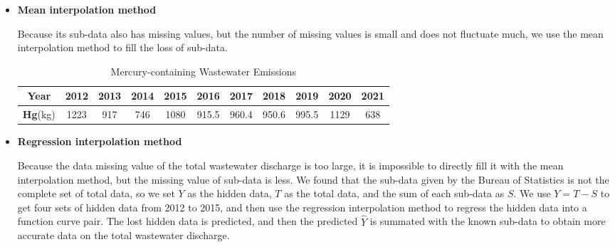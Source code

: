 \documentclass[12pt]{article}
\begin{document}
	
	\begin{itemize}
		\item \textbf{Mean interpolation method}
		
		Because its sub-data also has missing values, but the number of missing values is small and does not fluctuate much, we use the mean interpolation method to fill the loss of sub-data.
		
		\begin{table}[!htbp]
			\begin{center}
				\caption{Mercury-containing Wastewater Emissions}
				\label{}
				\begin{tabular}{ccccccccccc}
					\toprule
					\multicolumn{1}{m{2cm}}{\centering \textbf{Year}}
					& \multicolumn{1}{m{1cm}}{\centering \small 2012}
					& \multicolumn{1}{m{1cm}}{\centering \small 2013}
					& \multicolumn{1}{m{1cm}}{\centering \small 2014}
					& \multicolumn{1}{m{1cm}}{\centering \small 2015}
					& \multicolumn{1}{m{1cm}}{\centering \small 2016}
					& \multicolumn{1}{m{1cm}}{\centering \small 2017}
					& \multicolumn{1}{m{1cm}}{\centering \small 2018}
					& \multicolumn{1}{m{1cm}}{\centering \small 2019}
					& \multicolumn{1}{m{1cm}}{\centering \small 2020}
					& \multicolumn{1}{m{1cm}}{\centering \small 2021}\\
					\midrule
					\small \textbf{Hg}(kg) & 1223 & 917 & 746 & 1080 & 915.5 & 960.4 & 950.6 & 995.5 & 1129 & 638\\
					\bottomrule
				\end{tabular}
			\end{center}
		\end{table}
	
		\item \textbf{Regression interpolation method}
		
		Because the data missing value of the total wastewater discharge is too large, it is impossible to directly fill it with the mean interpolation method, but the missing value of sub-data is less.
		We found that the sub-data given by the Bureau of Statistics is not the complete set of total data, so we set $Y$ as the hidden data, $T$ as the total data, and the sum of each sub-data as $S$.
		We use $Y=T-S$ to get four sets of hidden data from 2012 to 2015, and then use the regression interpolation method to regress the hidden data into a function curve pair.
		The lost hidden data is predicted, and then the predicted $\hat{Y}$ is summated with the known sub-data to obtain more accurate data on the total wastewater discharge.
	\end{itemize}
\end{document}
